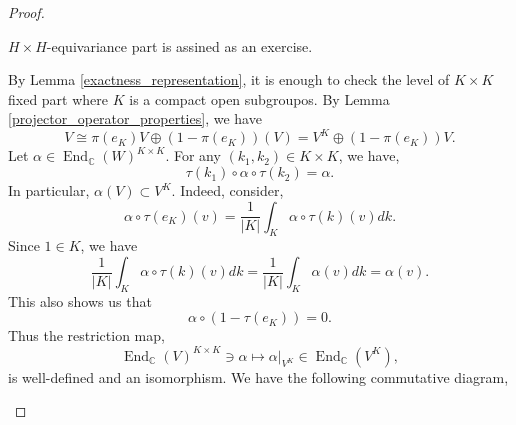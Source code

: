 \documentclass[8pt]{article}
\DeclareMathOperator{\End}{End}
\newcommand{\C}[0]{\mathbb{C}}
\begin{document}
\begin{proof}$\:$
  \begin{center}
  \end{center}
  $H\times H$-equivariance part is assined as an exercise. \\
  \par By Lemma \ref{exactness_representation}, it is enough to check the level of $K\times K$ fixed part where $K$ is a compact open subgroupos. By Lemma \ref{projector_operator_properties}, we have 
  \begin{equation*}
  V \cong \pi(e_K)V\oplus(1-\pi(e_K))(V) = V^K\oplus (1-\pi(e_K))V.
  \end{equation*}
  Let $\alpha\in\End_\C(W)^{K\times K}$. For any $(k_1,k_2)\in K\times K$, we have,
  \begin{equation*}
    \tau(k_1)\circ\alpha\circ\tau(k_2) = \alpha.
  \end{equation*}
  In particular, $\alpha(V)\subset V^K$. Indeed, consider,
  \begin{equation*}
    \alpha\circ\tau(e_K)(v) = {\frac 1 {\vert K\vert }}\int_K\alpha\circ\tau(k)(v)dk.
  \end{equation*}
  Since $1\in K$, we have 
  \begin{equation*}
    {\frac 1 {\vert K\vert }}\int_K\alpha\circ\tau(k)(v)dk = {\frac 1 {\vert K\vert}}\int_K\alpha(v)dk = \alpha(v).
  \end{equation*}
  This also shows us that 
  \begin{equation*}
    \alpha\circ(1-\tau(e_K)) = 0.
  \end{equation*}
  Thus the restriction map, 
  \begin{equation*}
    \End_\C(V)^{K\times K}\ni\alpha\mapsto \alpha|_{V^K}\in\End_\C(V^K),
  \end{equation*}
  is well-defined and an isomorphism. We have the following commutative diagram,
  \begin{center}
\begin{tikzcd}

\end{tikzcd}
\end{center}
\end{proof}
\end{document}
